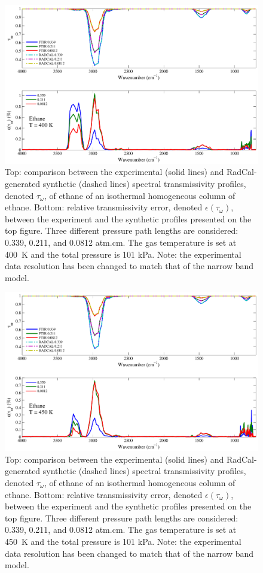 \begin{figure}[p]
\includegraphics[width=\textwidth]{../Verification/Results_Test2/Ethane_400.pdf}
\caption{Top: comparison between the experimental (solid lines) and RadCal-generated synthetic (dashed lines) spectral transmissivity profiles, denoted $\tau_{\omega}$, of ethane of an isothermal homogeneous column of ethane. Bottom: relative transmissivity error, denoted $\epsilon{(\tau_{\omega})}$, between the experiment and the synthetic profiles presented on the top figure. Three different pressure path lengths are considered: 0.339, 0.211, and 0.0812 atm.cm. The gas temperature is set at 400~K and the total pressure is 101 kPa. Note: the experimental data resolution has been changed to match that of the narrow band model. \label{fig:ethane_Verify_400K}}
\end{figure}

\begin{figure}[p]
\includegraphics[width=\textwidth]{../Verification/Results_Test2/Ethane_450.pdf}
\caption{Top: comparison between the experimental (solid lines) and RadCal-generated synthetic (dashed lines) spectral transmissivity profiles, denoted $\tau_{\omega}$, of ethane of an isothermal homogeneous column of ethane. Bottom: relative transmissivity error, denoted $\epsilon{(\tau_{\omega})}$, between the experiment and the synthetic profiles presented on the top figure. Three different pressure path lengths are considered: 0.339, 0.211, and 0.0812 atm.cm. The gas temperature is set at 450~K and the total pressure is 101 kPa. Note: the experimental data resolution has been changed to match that of the narrow band model. \label{fig:ethane_Verify_450K}}
\end{figure}

